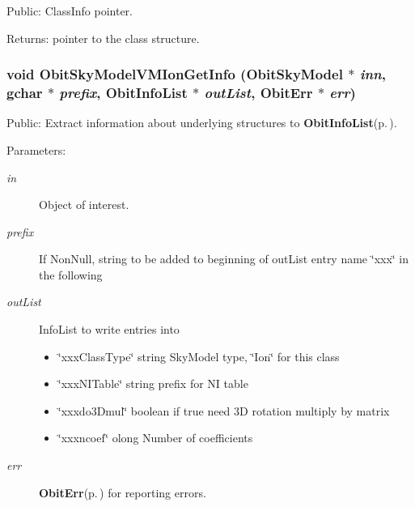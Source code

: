 Public: Class\-Info pointer. 

\begin{Desc}
\item[Returns:]pointer to the class structure. \end{Desc}
\subsubsection{\setlength{\rightskip}{0pt plus 5cm}void Obit\-Sky\-Model\-VMIon\-Get\-Info ({\bf Obit\-Sky\-Model} $\ast$ {\em inn}, gchar $\ast$ {\em prefix}, {\bf Obit\-Info\-List} $\ast$ {\em out\-List}, {\bf Obit\-Err} $\ast$ {\em err})}\label{ObitSkyModelVMIon_8c_a16}


Public: Extract information about underlying structures to {\bf Obit\-Info\-List}{\rm (p.\,\pageref{structObitInfoList})}. 

\begin{Desc}
\item[Parameters:]
\begin{description}
\item[{\em in}]Object of interest. \item[{\em prefix}]If Non\-Null, string to be added to beginning of out\-List entry name \char`\"{}xxx\char`\"{} in the following \item[{\em out\-List}]Info\-List to write entries into \begin{itemize}
\item \char`\"{}xxx\-Class\-Type\char`\"{} string Sky\-Model type, \char`\"{}Ion\char`\"{} for this class \item \char`\"{}xxx\-NITable\char`\"{} string prefix for NI table \item \char`\"{}xxxdo3Dmul\char`\"{} boolean if true need 3D rotation multiply by matrix \item \char`\"{}xxxncoef\char`\"{} olong Number of coefficients \end{itemize}
\item[{\em err}]{\bf Obit\-Err}{\rm (p.\,\pageref{structObitErr})} for reporting errors. \end{description}
\end{Desc}
